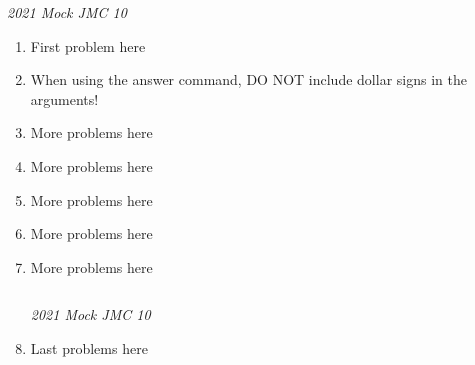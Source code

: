 \documentclass{article}
\newcommand{\mockAcronym}{JMC}
\newcommand{\tentwelve}{10} %
\newcommand{\theYear}{2021} %
\newcommand{\Label}{\emph{{\theYear} Mock {\mockAcronym} {\tentwelve}}\vspace{0.4cm}} %
\begin{document}

\large

\Label



\begin{enumerate}
\item First problem here


\item When using the answer command, DO NOT include dollar signs in the arguments!


\item More problems here


\item More problems here


\item More problems here


\item More problems here


\item More problems here


\newpage

$~~~~~~$


\newpage

\Label

\setcounter{enumi}{23} %

\item Last problems here



\end{enumerate}
\end{document}
